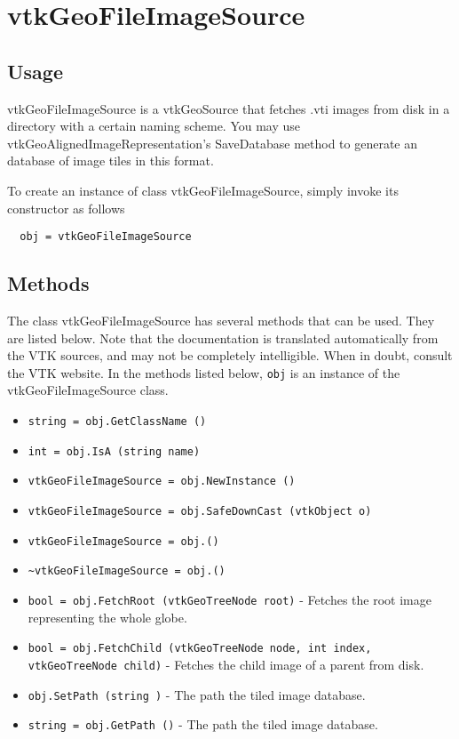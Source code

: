 \section{vtkGeoFileImageSource}

\subsection{Usage}

 vtkGeoFileImageSource is a vtkGeoSource that fetches .vti images from
 disk in a directory with a certain naming scheme. You may use
 vtkGeoAlignedImageRepresentation's SaveDatabase method to generate
 an database of image tiles in this format.

To create an instance of class vtkGeoFileImageSource, simply
invoke its constructor as follows
\begin{verbatim}
  obj = vtkGeoFileImageSource
\end{verbatim}
\subsection{Methods}

The class vtkGeoFileImageSource has several methods that can be used.
  They are listed below.
Note that the documentation is translated automatically from the VTK sources,
and may not be completely intelligible.  When in doubt, consult the VTK website.
In the methods listed below, \verb|obj| is an instance of the vtkGeoFileImageSource class.
\begin{itemize}
\item  \verb|string = obj.GetClassName ()|

\item  \verb|int = obj.IsA (string name)|

\item  \verb|vtkGeoFileImageSource = obj.NewInstance ()|

\item  \verb|vtkGeoFileImageSource = obj.SafeDownCast (vtkObject o)|

\item  \verb|vtkGeoFileImageSource = obj.()|

\item  \verb|~vtkGeoFileImageSource = obj.()|

\item  \verb|bool = obj.FetchRoot (vtkGeoTreeNode root)| -  Fetches the root image representing the whole globe.

\item  \verb|bool = obj.FetchChild (vtkGeoTreeNode node, int index, vtkGeoTreeNode child)| -  Fetches the child image of a parent from disk.

\item  \verb|obj.SetPath (string )| -  The path the tiled image database.

\item  \verb|string = obj.GetPath ()| -  The path the tiled image database.

\end{itemize}
